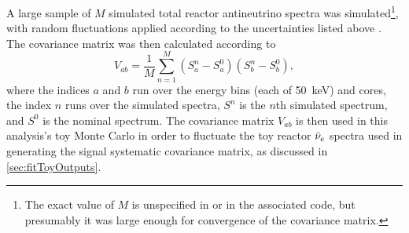 \documentclass[../thesis.tex]{subfiles}
\begin{document}
A large sample of $M$ simulated total reactor antineutrino spectra was simulated\footnote{The exact value of $M$ is unspecified in \cite{Lewis} or in the associated code, but presumably it was large enough for convergence of the covariance matrix.}, with random fluctuations applied according to the uncertainties listed above \cite{Lewis}. The covariance matrix was then calculated according to
\begin{equation}
  V_{ab} = \frac{1}{M} \sum_{n=1}^M(S^n_{a} - S^0_{a})(S^n_{b} - S^0_{b}),
\end{equation}
where the indices $a$ and $b$ run over the energy bins (each of 50~keV) and cores, the index $n$ runs over the simulated spectra, $S^n$ is the $n$th simulated spectrum, and $S^0$ is the nominal spectrum. The covariance matrix $V_{ab}$ is then used in this analysis's toy Monte Carlo in order to fluctuate the toy reactor $\bar\nu_e$ spectra used in generating the signal systematic covariance matrix, as discussed in \autoref{sec:fitToyOutputs}.
\end{document}
